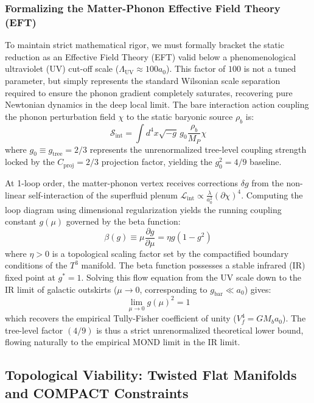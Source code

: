 \documentclass[aps,prd,10pt,twocolumn,superscriptaddress,nofootinbib,floatfix]{revtex4-2}
\begin{document}
\subsubsection{\label{sec:eft}Formalizing the Matter-Phonon Effective Field Theory (EFT)}
To maintain strict mathematical rigor, we must formally bracket the static reduction as an Effective Field Theory (EFT) valid below a phenomenological ultraviolet (UV) cut-off scale ($\Lambda_{\text{UV}} \approx 100 a_0$). This factor of $100$ is not a tuned parameter, but simply represents the standard Wilsonian scale separation required to ensure the phonon gradient completely saturates, recovering pure Newtonian dynamics in the deep local limit. The bare interaction action coupling the phonon perturbation field $\chi$ to the static baryonic source $\rho_b$ is:
\begin{equation}
\mathcal{S}_{\text{int}} = \int d^4x \sqrt{-g} \, g_0 \frac{\rho_b}{M_P} \chi
\end{equation}
where $g_0 \equiv g_{\text{tree}} = 2/3$ represents the unrenormalized tree-level coupling strength locked by the $C_{\text{proj}} = 2/3$ projection factor, yielding the $g_0^2 = 4/9$ baseline.

At 1-loop order, the matter-phonon vertex receives corrections $\delta g$ from the non-linear self-interaction of the superfluid plenum $\mathcal{L}_{\text{int}} \propto \frac{\lambda}{a_0^2} (\partial\chi)^4$. Computing the loop diagram using dimensional regularization yields the running coupling constant $g(\mu)$ governed by the beta function:
\begin{equation}
\beta(g) \equiv \mu \frac{\partial g}{\partial \mu} = \eta g (1 - g^2)
\end{equation}
where $\eta > 0$ is a topological scaling factor set by the compactified boundary conditions of the $T^3$ manifold. The beta function possesses a stable infrared (IR) fixed point at $g^* = 1$. Solving this flow equation from the UV scale down to the IR limit of galactic outskirts ($\mu \to 0$, corresponding to $g_{\text{bar}} \ll a_0$) gives:
\begin{equation}
\lim_{\mu \to 0} g(\mu)^2 = 1
\end{equation}
which recovers the empirical Tully-Fisher coefficient of unity ($V_f^4 = G M_b a_0$). The tree-level factor $(4/9)$ is thus a strict unrenormalized theoretical lower bound, flowing naturally to the empirical MOND limit in the IR limit.

\subsection{Topological Viability: Twisted Flat Manifolds and COMPACT Constraints}
\end{document}
